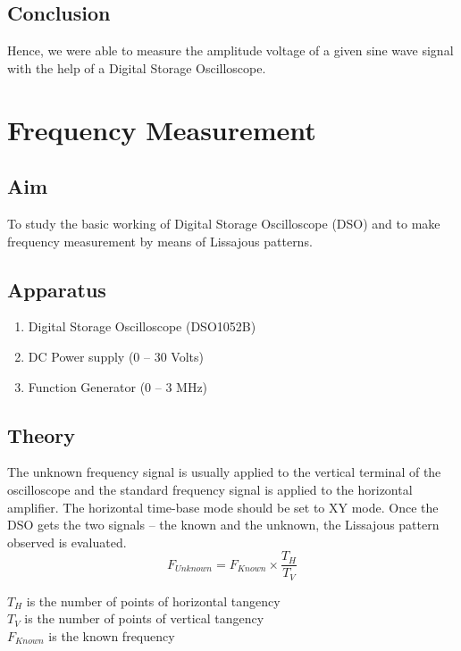 \documentclass{article}
\begin{document}
\subsection{Conclusion}
Hence, we were able to measure the amplitude voltage of a given sine wave signal
with the help of a Digital Storage Oscilloscope.
\newpage

\section{Frequency Measurement}
\vspace{15px}
\subsection{Aim}
To study the basic working of Digital Storage Oscilloscope (DSO) and to make frequency measurement by means of Lissajous patterns. 
\vspace{15px}
\subsection{Apparatus}
\begin{enumerate}
    \item Digital Storage Oscilloscope (DSO1052B)
    \item DC Power supply (0 – 30 Volts)
    \item Function Generator (0 – 3 MHz)
\end{enumerate}
\vspace{15px}
\subsection{Theory}

\begin{figure}
\end{figure}
The unknown frequency signal is usually applied to the vertical terminal of the
oscilloscope and the standard frequency signal is applied to the horizontal amplifier. The horizontal time-base mode should be set to XY mode. Once the
DSO gets the two signals – the known and the unknown, the Lissajous pattern observed is evaluated.
\begin{equation}
    F_{Unknown}=F_{Known} \times \frac{T_H}{T_V}
\end{equation}
\begin{center}
$T_H$ is the number of points of horizontal tangency \\
$T_V$ is the number of points of vertical tangency \\
$F_{Known}$ is the known frequency\\
\end{center}
\end{document}
